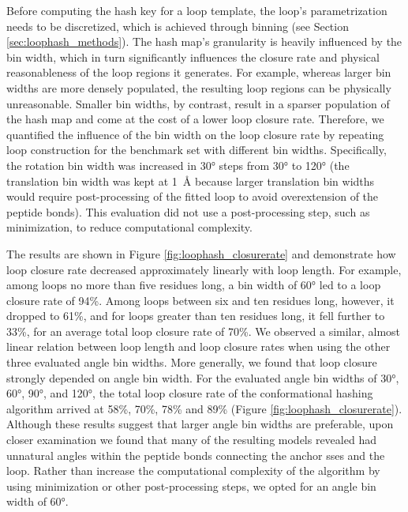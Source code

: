 Before computing the hash key for a loop template, the loop’s parametrization needs to be discretized, which is achieved through binning (see Section \ref{sec:loophash_methods}). The hash map's granularity is heavily influenced by the bin width, which in turn significantly influences the closure rate and physical reasonableness of the loop regions it generates. For example, whereas larger bin widths are more densely populated, the resulting loop regions can be physically unreasonable. Smaller bin widths, by contrast, result in a sparser population of the hash map and come at the cost of a lower loop closure rate. Therefore, we quantified the influence of the bin width on the loop closure rate by repeating loop construction for the benchmark set with different bin widths. Specifically, the rotation bin width was increased in 30° steps from 30° to 120° (the translation bin width was kept at \SI{1}{\angstrom} because larger translation bin widths would require post-processing of the fitted loop to avoid overextension of the peptide bonds). This evaluation did not use a post-processing step, such as minimization, to reduce computational complexity.

The results are shown in Figure \ref{fig:loophash_closurerate} and demonstrate how loop closure rate decreased approximately linearly with loop length. For example, among loops no more than five residues long, a bin width of 60° led to a loop closure rate of 94\%. Among loops between six and ten residues long, however, it dropped to 61\%, and for loops greater than ten residues long, it fell further to 33\%, for an average total loop closure rate of 70\%. We observed a similar, almost linear relation between loop length and loop closure rates when using the other three evaluated angle bin widths. More generally, we found that loop closure strongly depended on angle bin width. For the evaluated angle bin widths of 30°, 60°, 90°, and 120°, the total loop closure rate of the conformational hashing algorithm arrived at 58\%, 70\%, 78\% and 89\% (Figure \ref{fig:loophash_closurerate}). Although these results suggest that larger angle bin widths are preferable, upon closer examination we found that many of the resulting models revealed had unnatural angles within the peptide bonds connecting the anchor \gls{sse}s and the loop. Rather than increase the computational complexity of the algorithm by using minimization or other post-processing steps, we opted for an angle bin width of 60°.

